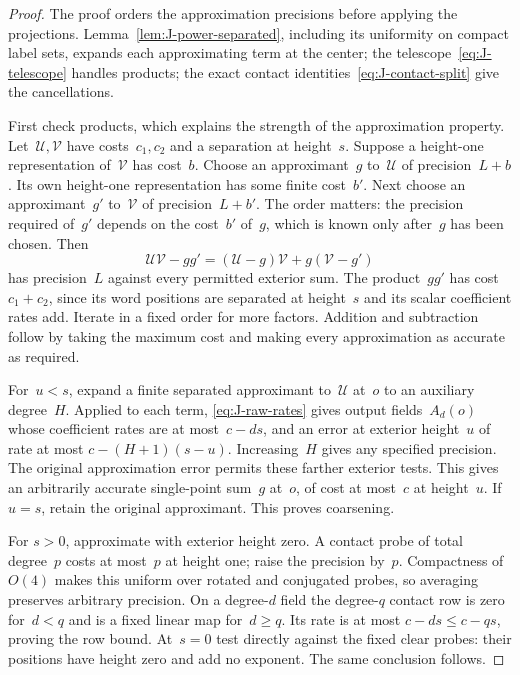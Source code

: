 \begin{proof}\label{proof:J-layer-start}
The proof orders the approximation precisions before applying the projections. Lemma~\ref{lem:J-power-separated}, including its uniformity on compact label sets, expands each approximating term at the center; the telescope~\eqref{eq:J-telescope} handles products; the exact contact identities~\eqref{eq:J-contact-split} give the cancellations.

First check products, which explains the strength of the approximation property. Let~$\mathcal U,\mathcal V$ have costs~$c_1,c_2$ and a separation at height~$s$. Suppose a height-one representation of~$\mathcal V$ has cost~$b$. Choose an approximant~$g$ to~$\mathcal U$ of precision~$L+b$. Its own height-one representation has some finite cost~$b'$. Next choose an approximant~$g'$ to~$\mathcal V$ of precision~$L+b'$. The order matters: the precision required of~$g'$ depends on the cost~$b'$ of~$g$, which is known only after~$g$ has been chosen. Then
\begin{equation*}
\mathcal U\mathcal V-gg'=(\mathcal U-g)\mathcal V+g(\mathcal V-g')
\end{equation*}
has precision~$L$ against every permitted exterior sum. The product~$gg'$ has cost~$c_1+c_2$, since its word positions are separated at height~$s$ and its scalar coefficient rates add. Iterate in a fixed order for more factors. Addition and subtraction follow by taking the maximum cost and making every approximation as accurate as required.

For~$u<s$, expand a finite separated approximant to~$\mathcal U$ at~$o$ to an auxiliary degree~$H$. Applied to each term, \eqref{eq:J-raw-rates} gives output fields~$A_d(o)$ whose coefficient rates are at most~$c-ds$, and an error at exterior height~$u$ of rate at most $c-(H+1)(s-u)$. Increasing~$H$ gives any specified precision. The original approximation error permits these farther exterior tests. This gives an arbitrarily accurate single-point sum~$g$ at~$o$, of cost at most~$c$ at height~$u$. If $u=s$, retain the original approximant. This proves coarsening.

For $s>0$, approximate with exterior height zero. A contact probe of total degree~$p$ costs at most~$p$ at height one; raise the precision by~$p$. Compactness of~$O(4)$ makes this uniform over rotated and conjugated probes, so averaging preserves arbitrary precision. On a degree-$d$ field the degree-$q$ contact row is zero for~$d<q$ and is a fixed linear map for~$d\ge q$. Its rate is at most $c-ds\le c-qs$, proving the row bound. At~$s=0$ test directly against the fixed clear probes: their positions have height zero and add no exponent. The same conclusion follows.


\end{proof}
